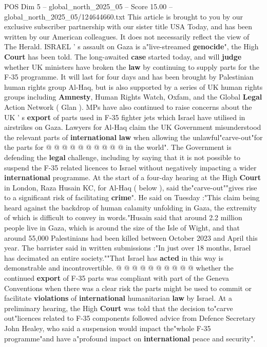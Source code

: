 \begin{textsample}{POS Dim 5 – global\_north\_2025\_05 – Score 15.00 – global\_north\_2025\_05/124644660.txt}  \label{ex:f5_pos_134}
This article is brought to you by our exclusive subscriber partnership with our sister title USA Today, and has been written by our American colleagues.
It does not necessarily reflect the view of The Herald.
ISRAEL ' s assault on Gaza is a"live-streamed \textbf{genocide}", the High \textbf{Court} has been told.
The long-awaited \textbf{case} started today, and will \textbf{judge} whether UK ministers have broken the \textbf{law} by continuing to supply parts for the F-35 programme.
It will last for four days and has been brought by Palestinian human rights group Al-Haq, but is also supported by a series of UK human rights groups including \textbf{Amnesty}, Human Rights Watch, Oxfam, and the Global \textbf{Legal} Action Network ( Glan ).
MPs have also continued to raise concerns about the UK ' s \textbf{export} of parts used in F-35 fighter jets which Israel have utilised in airstrikes on Gaza.
Lawyers for Al-Haq claim the UK Government misunderstood the relevant parts of \textbf{international} \textbf{law} when allowing the unlawful"carve-out"for the parts for @ @ @ @ @ @ @ @ @ @ in the world".
The Government is defending the \textbf{legal} challenge, including by saying that it is not possible to suspend the F-35 related licences to Israel without negatively impacting a wider \textbf{international} programme.
At the start of a four-day hearing at the High \textbf{Court} in London, Raza Husain KC, for Al-Haq ( below ), said the"carve-out""gives rise to a significant risk of facilitating \textbf{crime}".
He said on Tuesday :"This claim being heard against the backdrop of human calamity unfolding in Gaza, the extremity of which is difficult to convey in words."Husain said that around 2.2 million people live in Gaza, which is around the size of the Isle of Wight, and that around 55,000 Palestinians had been killed between October 2023 and April this year.
The barrister said in written submissions :"In just over 18 months, Israel has decimated an entire society.""That Israel has \textbf{acted} in this way is demonstrable and incontrovertible. @ @ @ @ @ @ @ @ @ @ whether the continued \textbf{export} of F-35 parts was compliant with part of the Geneva Conventions when there was a clear risk the parts might be used to commit or facilitate \textbf{violations} of \textbf{international} humanitarian \textbf{law} by Israel.
At a preliminary hearing, the High \textbf{Court} was told that the decision to"carve out"licences related to F-35 components followed advice from Defence Secretary John Healey, who said a suspension would impact the"whole F-35 programme"and have a"profound impact on \textbf{international} peace and security".

\end{textsample}
